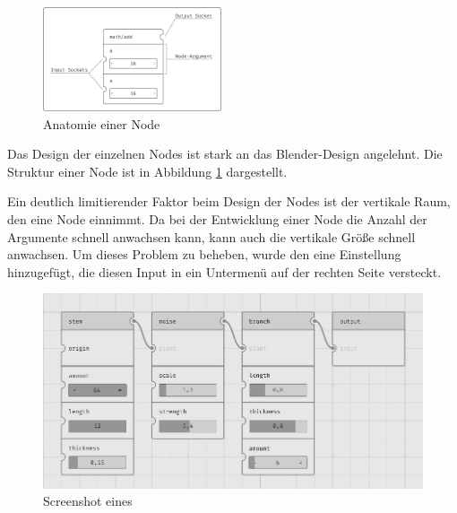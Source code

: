 \documentclass[ngerman]{article}
\begin{document}
\begingroup
\setlength\intextsep{4pt}
\begin{minipage}{\linewidth}
\begin{figure}
    \includegraphics[width=0.47\textwidth]{graphics/NODE_ANATOMY.pdf}
    \caption{Anatomie einer Node}
    \label{sec:NODE_ANATOMY}
\end{figure}

Das Design der einzelnen Nodes ist stark an das Blender-Design angelehnt. Die Struktur einer Node ist in Abbildung \ref{sec:NODE_ANATOMY} dargestellt. 

Ein deutlich limitierender Faktor beim Design der Nodes ist der vertikale Raum, den eine Node einnimmt. Da bei der Entwicklung einer Node die Anzahl der Argumente schnell anwachsen kann, kann auch die vertikale Größe schnell anwachsen. 
Um dieses Problem zu beheben, wurde den  eine Einstellung hinzugefügt, die diesen Input in ein Untermenü auf der rechten Seite versteckt. 
\end{minipage}
\br
\endgroup

\begin{figure}[htpb]
  \centering
  \includegraphics[width=1\textwidth]{graphics/node_graph.jpg}
  \caption{Screenshot eines }
  \label{fig:node_graph_screenshot}
\end{figure}
\end{document}
